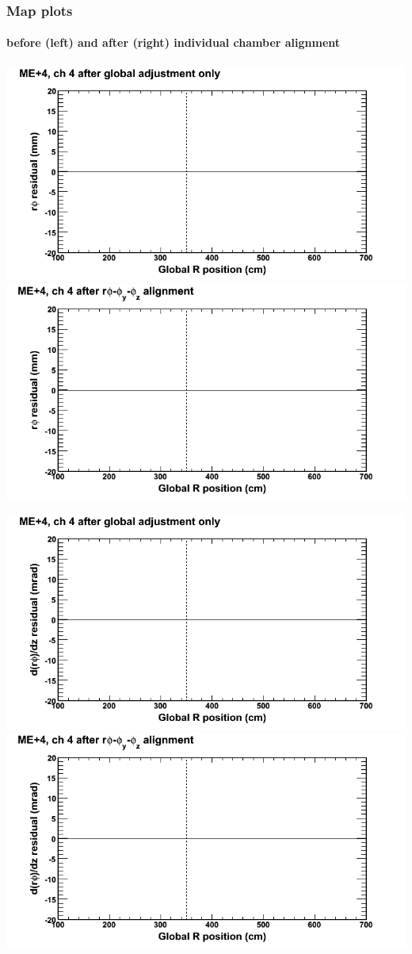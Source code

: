 \documentclass[compress]{beamer}
\begin{document}
\begin{frame}
\frametitle{Map plots}
\framesubtitle{before (left) and after (right) individual chamber alignment}
\includegraphics[width=0.5\linewidth]{ringmapplots_3dof/before_CSCvsr_mep4ch04_x.png} \includegraphics[width=0.5\linewidth]{ringmapplots_3dof/after_CSCvsr_mep4ch04_x.png}

\includegraphics[width=0.5\linewidth]{ringmapplots_3dof/before_CSCvsr_mep4ch04_dxdz.png} \includegraphics[width=0.5\linewidth]{ringmapplots_3dof/after_CSCvsr_mep4ch04_dxdz.png}
\end{frame}
\end{document}
